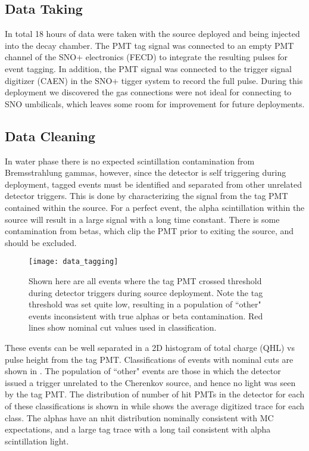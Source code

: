 \subsection{Data Taking}
In total 18 hours of data were taken with the source deployed and \Li being injected into the decay chamber.
The PMT tag signal was connected to an empty PMT channel of the SNO+ electronics (FECD) to integrate the resulting pulses for event tagging.
In addition, the PMT signal was connected to the trigger signal digitizer (CAEN) in the SNO+ tigger system to record the full pulse.
During this deployment we discovered the gas connections were not ideal for connecting to SNO umbilicals, which leaves some room for improvement for future deployments.

\subsection{Data Cleaning}
In water phase there is no expected scintillation contamination from Bremsstrahlung gammas, however, since the detector is self triggering during deployment, tagged events must be identified and separated from other unrelated detector triggers.
This is done by characterizing the signal from the tag PMT contained within the source.
For a perfect event, the alpha scintillation within the source will result in a large signal with a long time constant.
There is some contamination from \Li betas, which clip the PMT prior to exiting the source, and should be excluded.


\begin{figure}
\centering
\texttt{[image: data\_tagging]}
\caption{\label{fig:chsrc_classify} Shown here are all events where the tag PMT crossed threshold during detector triggers during source deployment. Note the tag threshold was set quite low, resulting in a population of ``other" events inconsistent with true alphas or beta contamination. Red lines show nominal cut values used in classification.}
\end{figure}

These events can be well separated in a 2D histogram of total charge (QHL) vs pulse height from the tag PMT. 
Classifications of events with nominal cuts are shown in .
The population of ``other" events are those in which the detector issued a trigger unrelated to the Cherenkov source, and hence no light was seen by the tag PMT.
The distribution of number of hit PMTs in the detector for each of these classifications is shown in  while  shows the average digitized trace for each class.
The alphas have an nhit distribution nominally consistent with MC expectations, and a large tag trace with a long tail consistent with alpha scintillation light.


